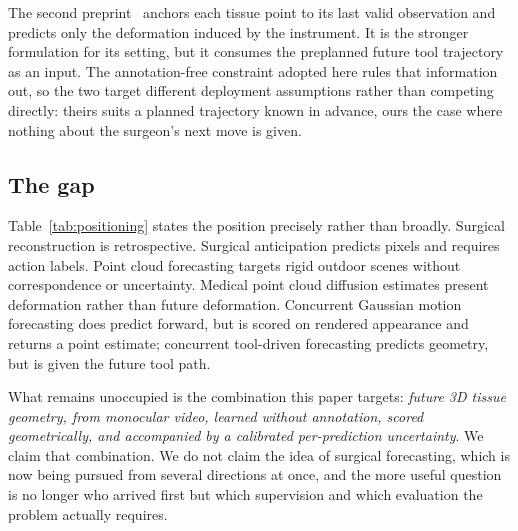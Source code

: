 \documentclass[conference]{IEEEtran}
\begin{document}
The second preprint~\cite{obsref2026} anchors each tissue point to its last valid
observation and predicts only the deformation induced by the instrument. It is the
stronger formulation for its setting, but it consumes the preplanned future tool
trajectory as an input. The annotation-free constraint adopted here rules that information
out, so the two target different deployment assumptions rather than competing directly:
theirs suits a planned trajectory known in advance, ours the case where nothing about the
surgeon's next move is given.

\subsection{The gap}
Table~\ref{tab:positioning} states the position precisely rather than broadly. Surgical
reconstruction is retrospective. Surgical anticipation predicts pixels and requires action
labels. Point cloud forecasting targets rigid outdoor scenes without correspondence or
uncertainty. Medical point cloud diffusion estimates present deformation rather than
future deformation. Concurrent Gaussian motion forecasting does predict forward, but is
scored on rendered appearance and returns a point estimate; concurrent tool-driven
forecasting predicts geometry, but is given the future tool path.

What remains unoccupied is the combination this paper targets: \emph{future 3D tissue
geometry, from monocular video, learned without annotation, scored geometrically, and
accompanied by a calibrated per-prediction uncertainty}. We claim that combination. We do
not claim the idea of surgical forecasting, which is now being pursued from several
directions at once, and the more useful question is no longer who arrived first but which
supervision and which evaluation the problem actually requires.
\end{document}
